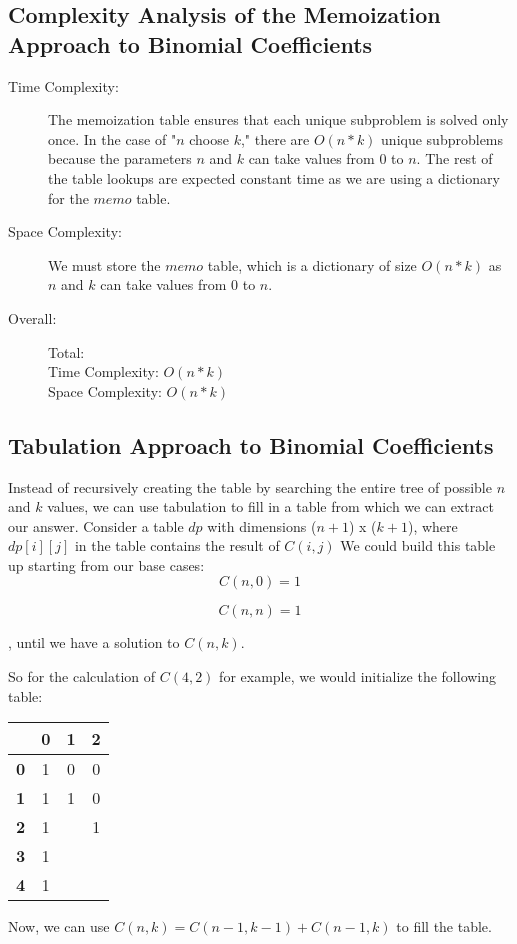 \subsection{Complexity Analysis of the Memoization Approach to Binomial Coefficients}
\begin{description}
    \item[Time Complexity:]
        The memoization table ensures that each unique subproblem is solved only once.
        In the case of "$n$ choose $k$," there are $O(n * k)$ unique subproblems because the parameters $n$ and $k$ can take values from $0$ to $n$.
        The rest of the table lookups are expected constant time as we are using a dictionary for the $memo$ table.

    \item[Space Complexity:] 
        We must store the $memo$ table, which is a dictionary of size $O(n * k)$ as $n$ and $k$ can take values from $0$ to $n$.

    \item[Overall:] Total:\\
        Time Complexity: $O(n * k)$\\
        Space Complexity: $O(n * k)$
    
\end{description}

\subsection{Tabulation Approach to Binomial Coefficients}
Instead of recursively creating the table by searching the entire tree of possible $n$ and $k$ values, we can use tabulation to fill in a table from which we can extract our answer.
Consider a table $dp$ with dimensions ($n+1$) x ($k+1$), where $dp[i][j]$ in the table contains the result of $C(i,j)$
We could build this table up starting from our base cases:
$$C(n,0) = 1$$

$$C(n,n) = 1$$

, until we have a solution to $C(n,k)$.

So for the calculation of $C(4,2)$ for example, we would initialize the following table:

\begin{table}[htbp]
    \centering
    \begin{tabular}{|c|c|c|c|}
        \hline
          & \textbf{0} & \textbf{1} & \textbf{2} \\
        \hline
        \textbf{0} & 1 & 0 & 0 \\
        \hline
        \textbf{1} & 1 & 1 & 0 \\
        \hline
        \textbf{2} & 1 &   & 1 \\
        \hline
        \textbf{3} & 1 &   &  \\
        \hline
        \textbf{4} & 1 &   &   \\
        \hline
    \end{tabular}
\end{table}
Now, we can use $C(n,k) = C(n-1,k-1) + C(n-1,k)$ to fill the table.

